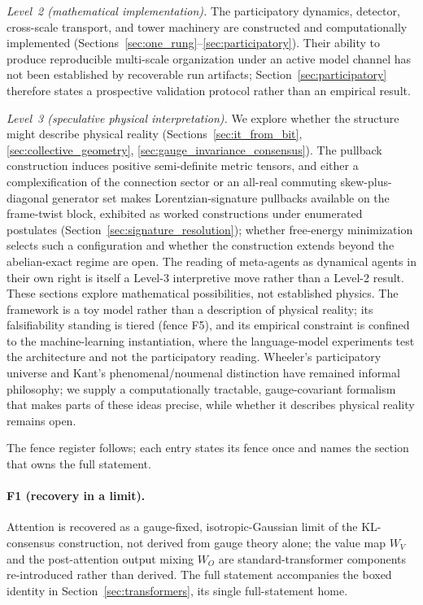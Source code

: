\documentclass[11pt]{article}
\begin{document}
\emph{Level~2 (mathematical implementation).} The participatory dynamics, detector, cross-scale transport, and tower machinery are constructed and computationally implemented (Sections~\ref{sec:one_rung}--\ref{sec:participatory}). Their ability to produce reproducible multi-scale organization under an active model channel has not been established by recoverable run artifacts; Section~\ref{sec:participatory} therefore states a prospective validation protocol rather than an empirical result.

\emph{Level~3 (speculative physical interpretation).} We explore whether the structure might describe physical reality (Sections~\ref{sec:it_from_bit}, \ref{sec:collective_geometry}, \ref{sec:gauge_invariance_consensus}). The pullback construction induces positive semi-definite metric tensors, and either a complexification of the connection sector or an all-real commuting skew-plus-diagonal generator set makes Lorentzian-signature pullbacks available on the frame-twist block, exhibited as worked constructions under enumerated postulates (Section~\ref{sec:signature_resolution}); whether free-energy minimization selects such a configuration and whether the construction extends beyond the abelian-exact regime are open. The reading of meta-agents as dynamical agents in their own right is itself a Level-3 interpretive move rather than a Level-2 result. These sections explore mathematical possibilities, not established physics. The framework is a toy model rather than a description of physical reality; its falsifiability standing is tiered (fence F5), and its empirical constraint is confined to the machine-learning instantiation, where the language-model experiments test the architecture and not the participatory reading. Wheeler's participatory universe and Kant's phenomenal/noumenal distinction have remained informal philosophy; we supply a computationally tractable, gauge-covariant formalism that makes parts of these ideas precise, while whether it describes physical reality remains open.

The fence register follows; each entry states its fence once and names the section that owns the full statement.

\paragraph{F1 (recovery in a limit).} Attention is recovered as a gauge-fixed, isotropic-Gaussian limit of the KL-consensus construction, not derived from gauge theory alone; the value map $W_V$ and the post-attention output mixing $W_O$ are standard-transformer components re-introduced rather than derived. The full statement accompanies the boxed identity in Section~\ref{sec:transformers}, its single full-statement home.
\end{document}
